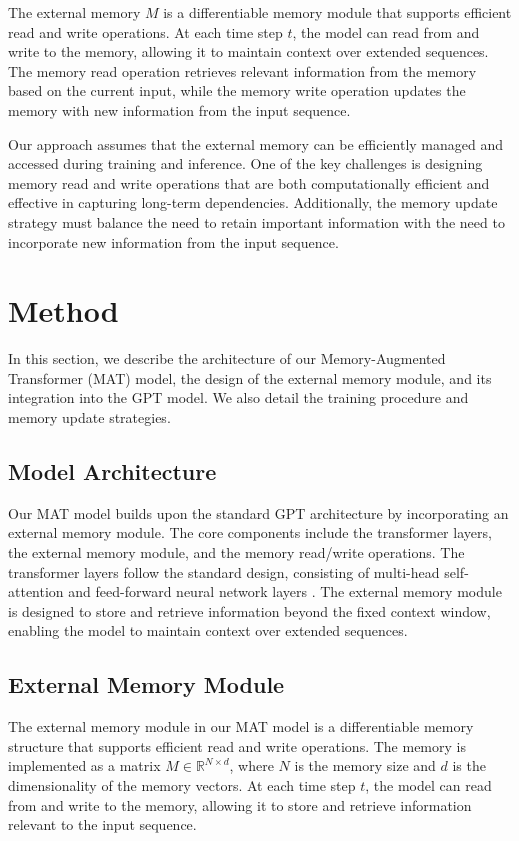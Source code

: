 \documentclass{article} %
\begin{document}
The external memory \( M \) is a differentiable memory module that supports efficient read and write operations. At each time step \( t \), the model can read from and write to the memory, allowing it to maintain context over extended sequences. The memory read operation retrieves relevant information from the memory based on the current input, while the memory write operation updates the memory with new information from the input sequence.

Our approach assumes that the external memory can be efficiently managed and accessed during training and inference. One of the key challenges is designing memory read and write operations that are both computationally efficient and effective in capturing long-term dependencies. Additionally, the memory update strategy must balance the need to retain important information with the need to incorporate new information from the input sequence.

\section{Method}
\label{sec:method}

In this section, we describe the architecture of our Memory-Augmented Transformer (MAT) model, the design of the external memory module, and its integration into the GPT model. We also detail the training procedure and memory update strategies.

\subsection{Model Architecture}
Our MAT model builds upon the standard GPT architecture by incorporating an external memory module. The core components include the transformer layers, the external memory module, and the memory read/write operations. The transformer layers follow the standard design, consisting of multi-head self-attention and feed-forward neural network layers \citep{vaswani2017attention}. The external memory module is designed to store and retrieve information beyond the fixed context window, enabling the model to maintain context over extended sequences.

\subsection{External Memory Module}
The external memory module in our MAT model is a differentiable memory structure that supports efficient read and write operations. The memory is implemented as a matrix \( M \in \mathbb{R}^{N \times d} \), where \( N \) is the memory size and \( d \) is the dimensionality of the memory vectors. At each time step \( t \), the model can read from and write to the memory, allowing it to store and retrieve information relevant to the input sequence.
\end{document}
